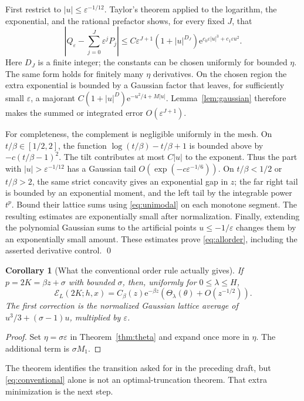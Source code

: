 \documentclass[11pt,a4paper]{article}
\numberwithin{equation}{section}
\newtheorem{corollary}[theorem]{Corollary}
\theoremstyle{definition}\newtheorem{definition}[theorem]{Definition}
\theoremstyle{remark}\newtheorem{remark}[theorem]{Remark}
\newcommand{\e}{\mathrm e}
\newcommand{\eps}{\varepsilon}
\newcommand{\calE}{\mathcal E}
\begin{document}
First restrict to $|u|\le\eps^{-1/12}$. Taylor's theorem applied to the
logarithm, the exponential, and the rational prefactor shows, for every
fixed $J$, that
\begin{equation}
 \left|Q_\eps-\sum_{j=0}^J\eps^jP_j\right|
 \le C\eps^{J+1}(1+|u|^{D_J})\e^{c_0\eps |u|^3+c_1\eps u^2}.
 \label{eq:taylor-dom}
\end{equation}
Here $D_J$ is a finite integer; the constants can be chosen uniformly for
bounded $\eta$. The same form holds for finitely many $\eta$ derivatives.
On the chosen region the extra exponential is bounded by a Gaussian
factor that leaves, for sufficiently small $\eps$, a majorant
$C(1+|u|^{D})\e^{-u^2/4+M|u|}$. Lemma~\ref{lem:gaussian} therefore makes the
summed or integrated error $O(\eps^{J+1})$.

For completeness, the complement is negligible uniformly in the mesh.
On $t/\beta\in[1/2,2]$, the function
$\log(t/\beta)-t/\beta+1$ is bounded above by
$-c(t/\beta-1)^2$. The tilt contributes at most $C|u|$ to the exponent.
Thus the part with $|u|>\eps^{-1/12}$ has a Gaussian tail
$O(\exp(-c\eps^{-1/6}))$. On $t/\beta<1/2$ or $t/\beta>2$, the same
strict concavity gives an exponential gap in $z$; the far right tail is
bounded by an exponential moment, and the left tail by the integrable
power $t^p$. Bound their lattice sums using \eqref{eq:unimodal} on each
monotone segment. The resulting estimates are exponentially small after
normalization. Finally, extending the polynomial Gaussian sums to the
artificial points $u\le-1/\eps$ changes them by an exponentially small
amount. These estimates prove \eqref{eq:allorder}, including the asserted
derivative control. \qed

\begin{corollary}[What the conventional order rule actually gives]
\label{cor:conventional}
If $p=2K=\beta z+\sigma$ with bounded $\sigma$, then, uniformly for
$0\le\lambda\le H$,
\begin{equation}
 \calE_L(2K;h,x)
 =C_\beta(z)\e^{-\beta z}
       \left(\Theta_\lambda(\theta)+O(z^{-1/2})\right).
 \label{eq:conventional}
\end{equation}
The first correction is the normalized Gaussian lattice average of
$u^3/3+(\sigma-1)u$, multiplied by $\eps$.
\end{corollary}
\begin{proof}
Set $\eta=\sigma\eps$ in Theorem~\ref{thm:theta} and expand once more in
$\eta$. The additional term is $\sigma M_1$.
\end{proof}
The theorem identifies the transition asked for in the preceding draft,
but \eqref{eq:conventional} alone is not an optimal-truncation theorem.
That extra minimization is the next step.
\end{document}
